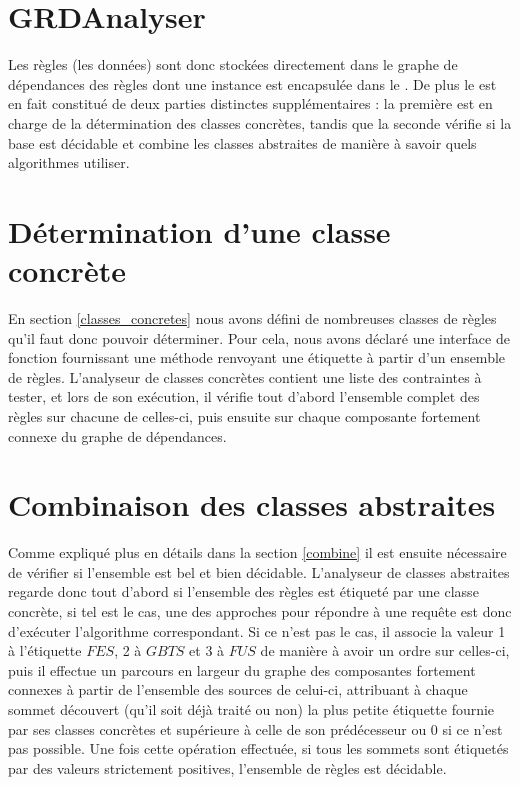 


\section{GRDAnalyser}\label{impl_grd_analyser}
Les règles (les données) sont donc stockées directement dans le graphe de dépendances des
règles dont une instance est encapsulée dans le \grdanalyser.
De plus le \grdanalyser est en fait constitué de deux parties distinctes supplémentaires
: la première est en charge de la détermination des classes concrètes, tandis que la
seconde vérifie si la base est décidable et combine les classes
abstraites de manière à savoir quels algorithmes utiliser.

\section{Détermination d'une classe concrète}\label{impl_classe_concrete}
En section \ref{classes_concretes} nous avons défini de nombreuses classes de règles
qu'il faut donc pouvoir déterminer.
Pour cela, nous avons déclaré une interface de fonction 
fournissant une méthode renvoyant une étiquette à partir d'un ensemble de règles.
L'analyseur de classes concrètes contient une liste des contraintes à tester, et lors de
son exécution, il vérifie tout d'abord l'ensemble complet des règles sur chacune de
celles-ci, puis ensuite sur chaque composante fortement connexe du graphe de dépendances.

\section{Combinaison des classes abstraites}\label{impl_combine}
Comme expliqué plus en détails dans la section \ref{combine} il est ensuite
nécessaire de vérifier si l'ensemble est bel et bien décidable.
L'analyseur de classes abstraites regarde donc tout d'abord si l'ensemble des règles est
étiqueté par une classe concrète, si tel est le cas, une des approches pour répondre à
une requête est donc d'exécuter l'algorithme correspondant.
Si ce n'est pas le cas, il associe la valeur 1 à l'étiquette $FES$, 
2 à $GBTS$ et 3 à $FUS$ de manière à avoir un ordre sur celles-ci, 
puis il effectue un parcours  en largeur du graphe des 
composantes fortement connexes à partir de l'ensemble des sources de celui-ci, attribuant à
chaque sommet découvert (qu'il soit déjà traité ou non) la plus petite étiquette
fournie par ses classes concrètes et supérieure à celle de son prédécesseur ou 0 si 
ce n'est pas possible.
Une fois cette opération effectuée, si tous les sommets sont étiquetés par des valeurs 
strictement positives, l'ensemble de règles est décidable.


